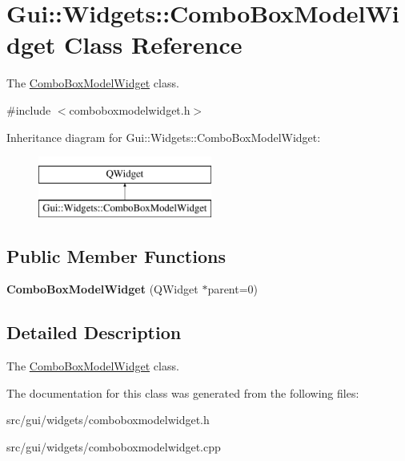 \hypertarget{classGui_1_1Widgets_1_1ComboBoxModelWidget}{\section{Gui\+:\+:Widgets\+:\+:Combo\+Box\+Model\+Widget Class Reference}
\label{classGui_1_1Widgets_1_1ComboBoxModelWidget}
}


The \hyperlink{classGui_1_1Widgets_1_1ComboBoxModelWidget}{Combo\+Box\+Model\+Widget} class.  




{\ttfamily \#include $<$comboboxmodelwidget.\+h$>$}

Inheritance diagram for Gui\+:\+:Widgets\+:\+:Combo\+Box\+Model\+Widget\+:\begin{figure}[H]
\begin{center}
\leavevmode
\includegraphics[height=2.000000cm]{d2/de0/classGui_1_1Widgets_1_1ComboBoxModelWidget}
\end{center}
\end{figure}
\subsection*{Public Member Functions}
\begin{DoxyCompactItemize}
\item 
\hypertarget{classGui_1_1Widgets_1_1ComboBoxModelWidget_afeca0199adce7d17dc440e8fa546c9e5}{{\bfseries Combo\+Box\+Model\+Widget} (Q\+Widget $\ast$parent=0)}\label{classGui_1_1Widgets_1_1ComboBoxModelWidget_afeca0199adce7d17dc440e8fa546c9e5}

\end{DoxyCompactItemize}


\subsection{Detailed Description}
The \hyperlink{classGui_1_1Widgets_1_1ComboBoxModelWidget}{Combo\+Box\+Model\+Widget} class. 

The documentation for this class was generated from the following files\+:\begin{DoxyCompactItemize}
\item 
src/gui/widgets/comboboxmodelwidget.\+h\item 
src/gui/widgets/comboboxmodelwidget.\+cpp\end{DoxyCompactItemize}
